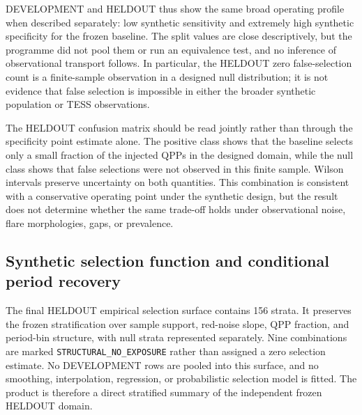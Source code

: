 \documentclass[11pt,a4paper]{article}
\begin{document}
DEVELOPMENT and HELDOUT thus show the same broad operating profile when described separately: low synthetic sensitivity and extremely high synthetic specificity for the frozen baseline. The split values are close descriptively, but the programme did not pool them or run an equivalence test, and no inference of observational transport follows. In particular, the HELDOUT zero false-selection count is a finite-sample observation in a designed null distribution; it is not evidence that false selection is impossible in either the broader synthetic population or TESS observations.

\clearpage
\begin{landscape}
\begingroup
\setlength{\tabcolsep}{1.1pt}
\renewcommand{\small}{\fontsize{7.2}{8.1}\selectfont}
\let\moneoldunderscore\_
\renewcommand{\_}{\moneoldunderscore\allowbreak}
\renewcommand{\label}[1]{}

\endgroup
\end{landscape}
\clearpage

The HELDOUT confusion matrix should be read jointly rather than through the specificity point estimate alone. The positive class shows that the baseline selects only a small fraction of the injected QPPs in the designed domain, while the null class shows that false selections were not observed in this finite sample. Wilson intervals preserve uncertainty on both quantities. This combination is consistent with a conservative operating point under the synthetic design, but the result does not determine whether the same trade-off holds under observational noise, flare morphologies, gaps, or prevalence.

\subsection{Synthetic selection function and conditional period recovery}
The final HELDOUT empirical selection surface contains 156 strata. It preserves the frozen stratification over sample support, red-noise slope, QPP fraction, and period-bin structure, with null strata represented separately. Nine combinations are marked \texttt{STRUCTURAL\_NO\_EXPOSURE} rather than assigned a zero selection estimate. No DEVELOPMENT rows are pooled into this surface, and no smoothing, interpolation, regression, or probabilistic selection model is fitted. The product is therefore a direct stratified summary of the independent frozen HELDOUT domain.
\end{document}
